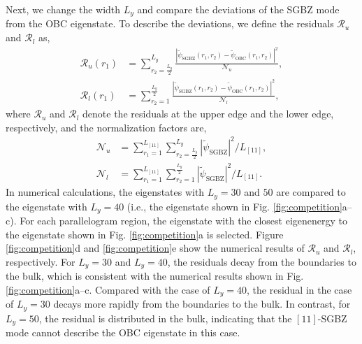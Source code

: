 Next, we change the width $L_{y}$ and compare the deviations of the
SGBZ mode from the OBC eigenstate. To describe the deviations, we
define the residuals $\mathcal{R}_{u}$ and $\mathcal{R}_{l}$ as,
\begin{align}
\mathcal{R}_{u}\left(r_{1}\right) & =\sum_{r_{2}=\frac{L_{y}}{2}}^{L_{y}}\frac{\left|\tilde{\psi}_{\text{SGBZ}}\left(r_{1},r_{2}\right)-\tilde{\psi}_{\text{OBC}}\left(r_{1},r_{2}\right)\right|^{2}}{\mathcal{N}_{u}},\label{eq:residual-upper}\\
\mathcal{R}_{l}\left(r_{1}\right) & =\sum_{r_{2}=1}^{\frac{L_{y}}{2}}\frac{\left|\tilde{\psi}_{\text{SGBZ}}\left(r_{1},r_{2}\right)-\tilde{\psi}_{\text{OBC}}\left(r_{1},r_{2}\right)\right|^{2}}{\mathcal{N}_{l}},\label{eq:residual-lower}
\end{align}
where $\mathcal{R}_{u}$ and $\mathcal{R}_{l}$ denote the residuals
at the upper edge and the lower edge, respectively, and the normalization
factors are, 
\begin{align}
\mathcal{N}_{u} & =\sum_{r_{1}=1}^{L_{[11]}}\sum_{r_{2}=\frac{L_{y}}{2}}^{L_{y}}\left|\tilde{\psi}_{\text{SGBZ}}\right|^{2}/L_{[11]},\\
\mathcal{N}_{l} & =\sum_{r_{1}=1}^{L_{[11]}}\sum_{r_{2}=1}^{\frac{L_{y}}{2}}\left|\tilde{\psi}_{\text{SGBZ}}\right|^{2}/L_{[11]}.
\end{align}
In numerical calculations, the eigenstates with $L_{y}=30$ and $50$
are compared to the eigenstate with $L_{y}=40$ (i.e., the eigenstate
shown in Fig. \ref{fig:competition}a--c). For each parallelogram
region, the eigenstate with the closest eigenenergy to the eigenstate
shown in Fig. \ref{fig:competition}a is selected. Figure \ref{fig:competition}d
and \ref{fig:competition}e show the numerical results of $\mathcal{R}_{u}$
and $\mathcal{R}_{l}$, respectively. For $L_{y}=30$ and $L_{y}=40$,
the residuals decay from the boundaries to the bulk, which is consistent
with the numerical results shown in Fig. \ref{fig:competition}a--c.
Compared with the case of $L_{y}=40$, the residual in the case of
$L_{y}=30$ decays more rapidly from the boundaries to the bulk. In
contrast, for $L_{y}=50$, the residual is distributed in the bulk,
indicating that the $[11]$-SGBZ mode cannot describe the OBC eigenstate
in this case.

